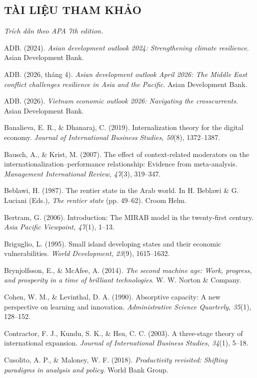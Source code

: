 \documentclass[12pt,a4paper]{article}
\begin{document}
\hypertarget{tuxe0i-liux1ec7u-tham-khux1ea3o}{%
\subsection{TÀI LIỆU THAM KHẢO}\label{tuxe0i-liux1ec7u-tham-khux1ea3o}}

\emph{Trích dẫn theo APA 7th edition.}

ADB. (2024). \emph{Asian development outlook 2024: Strengthening climate
resilience}. Asian Development Bank.

ADB. (2026, tháng 4). \emph{Asian development outlook April 2026: The
Middle East conflict challenges resilience in Asia and the Pacific}.
Asian Development Bank.

ADB. (2026). \emph{Vietnam economic outlook 2026: Navigating the
crosscurrents}. Asian Development Bank.

Banalieva, E. R., \& Dhanaraj, C. (2019). Internalization theory for the
digital economy. \emph{Journal of International Business Studies,
50}(8), 1372--1387.

Bausch, A., \& Krist, M. (2007). The effect of context-related
moderators on the internationalization--performance relationship:
Evidence from meta-analysis. \emph{Management International Review,
47}(3), 319--347.

Beblawi, H. (1987). The rentier state in the Arab world. In H. Beblawi
\& G. Luciani (Eds.), \emph{The rentier state} (pp. 49--62). Croom Helm.

Bertram, G. (2006). Introduction: The MIRAB model in the twenty-first
century. \emph{Asia Pacific Viewpoint, 47}(1), 1--13.

Briguglio, L. (1995). Small island developing states and their economic
vulnerabilities. \emph{World Development, 23}(9), 1615--1632.

Brynjolfsson, E., \& McAfee, A. (2014). \emph{The second machine age:
Work, progress, and prosperity in a time of brilliant technologies}. W.
W. Norton \& Company.

Cohen, W. M., \& Levinthal, D. A. (1990). Absorptive capacity: A new
perspective on learning and innovation. \emph{Administrative Science
Quarterly, 35}(1), 128--152.

Contractor, F. J., Kundu, S. K., \& Hsu, C. C. (2003). A three-stage
theory of international expansion. \emph{Journal of International
Business Studies, 34}(1), 5--18.

Cusolito, A. P., \& Maloney, W. F. (2018). \emph{Productivity revisited:
Shifting paradigms in analysis and policy}. World Bank Group.
\end{document}
